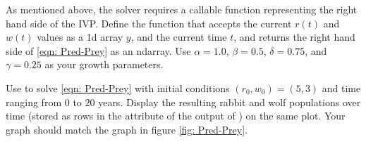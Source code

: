 \begin{problem}
As mentioned above, the  solver requires a callable function representing the right hand side of the IVP. 
Define the function  that accepts the current $r(t)$ and $w(t)$ values as a 1d array $y$, and the current time $t$, 
and returns the right hand side of \eqref{eqn: Pred-Prey} as an ndarray. 
Use $\alpha=1.0$, $\beta=0.5$, $\delta=0.75$, and $\gamma=0.25$ as your growth parameters.
%	

\end{problem}



\begin{problem}
Use  to solve \eqref{eqn: Pred-Prey} with initial conditions $(r_0, w_0) = (5, 3)$ and time ranging from $0$ to $20$ years.
Display the resulting rabbit and wolf populations over time (stored as rows in the attribute  of the output of ) on the same plot. Your graph should match the graph in figure \ref{fig: Pred-Prey}.
\end{problem}

